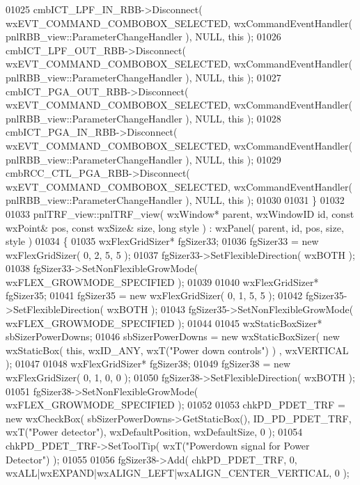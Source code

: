 \begin{DoxyCode}
01025     cmbICT_LPF_IN_RBB->Disconnect( wxEVT\_COMMAND\_COMBOBOX\_SELECTED, wxCommandEventHandler( 
      pnlRBB_view::ParameterChangeHandler ), NULL, \textcolor{keyword}{this} );
01026     cmbICT_LPF_OUT_RBB->Disconnect( wxEVT\_COMMAND\_COMBOBOX\_SELECTED, wxCommandEventHandler( 
      pnlRBB_view::ParameterChangeHandler ), NULL, \textcolor{keyword}{this} );
01027     cmbICT_PGA_OUT_RBB->Disconnect( wxEVT\_COMMAND\_COMBOBOX\_SELECTED, wxCommandEventHandler( 
      pnlRBB_view::ParameterChangeHandler ), NULL, \textcolor{keyword}{this} );
01028     cmbICT_PGA_IN_RBB->Disconnect( wxEVT\_COMMAND\_COMBOBOX\_SELECTED, wxCommandEventHandler( 
      pnlRBB_view::ParameterChangeHandler ), NULL, \textcolor{keyword}{this} );
01029     cmbRCC_CTL_PGA_RBB->Disconnect( wxEVT\_COMMAND\_COMBOBOX\_SELECTED, wxCommandEventHandler( 
      pnlRBB_view::ParameterChangeHandler ), NULL, \textcolor{keyword}{this} );
01030     
01031 \}
01032 
01033 pnlTRF_view::pnlTRF_view( wxWindow* parent, wxWindowID \textcolor{keywordtype}{id}, \textcolor{keyword}{const} wxPoint& pos, \textcolor{keyword}{const} wxSize& 
      size, \textcolor{keywordtype}{long} style ) : wxPanel( parent, id, pos, size, style )
01034 \{
01035     wxFlexGridSizer* fgSizer33;
01036     fgSizer33 = \textcolor{keyword}{new} wxFlexGridSizer( 0, 2, 5, 5 );
01037     fgSizer33->SetFlexibleDirection( wxBOTH );
01038     fgSizer33->SetNonFlexibleGrowMode( wxFLEX\_GROWMODE\_SPECIFIED );
01039     
01040     wxFlexGridSizer* fgSizer35;
01041     fgSizer35 = \textcolor{keyword}{new} wxFlexGridSizer( 0, 1, 5, 5 );
01042     fgSizer35->SetFlexibleDirection( wxBOTH );
01043     fgSizer35->SetNonFlexibleGrowMode( wxFLEX\_GROWMODE\_SPECIFIED );
01044     
01045     wxStaticBoxSizer* sbSizerPowerDowns;
01046     sbSizerPowerDowns = \textcolor{keyword}{new} wxStaticBoxSizer( \textcolor{keyword}{new} wxStaticBox( \textcolor{keyword}{this}, wxID\_ANY, wxT(\textcolor{stringliteral}{"Power down controls"}) )
      , wxVERTICAL );
01047     
01048     wxFlexGridSizer* fgSizer38;
01049     fgSizer38 = \textcolor{keyword}{new} wxFlexGridSizer( 0, 1, 0, 0 );
01050     fgSizer38->SetFlexibleDirection( wxBOTH );
01051     fgSizer38->SetNonFlexibleGrowMode( wxFLEX\_GROWMODE\_SPECIFIED );
01052     
01053     chkPD_PDET_TRF = \textcolor{keyword}{new} wxCheckBox( sbSizerPowerDowns->GetStaticBox(), 
      ID_PD_PDET_TRF, wxT(\textcolor{stringliteral}{"Power detector"}), wxDefaultPosition, wxDefaultSize, 0 );
01054     chkPD_PDET_TRF->SetToolTip( wxT(\textcolor{stringliteral}{"Powerdown signal for Power Detector"}) );
01055     
01056     fgSizer38->Add( chkPD_PDET_TRF, 0, wxALL|wxEXPAND|wxALIGN\_LEFT|wxALIGN\_CENTER\_VERTICAL, 0 );

\end{DoxyCode}
